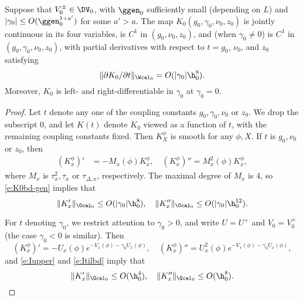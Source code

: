 \begin{prop}
\label{prop:Ksmooth}
Suppose that $V_0^\pm \in \DV_0$, with $\ggen_0$ sufficiently small
(depending on $L$) and $|\gamma_0| \le O(\ggen_0^{1+a'})$
for some $a' >a$.
The map $K_0(g_0, \gamma_0, \nu_0, z_0)$ is jointly continuous
in its four variables, is
$C^1$ in $(g_0, \nu_0, z_0)$,
and (when $\gamma_0 \ne 0$) is $C^1$ in $(g_0, \gamma_0, \nu_0, z_0)$,
with partial derivatives with respect to $t = g_0$, $\nu_0$, and $z_0$ satisfying
\begin{equation}
\label{e:ddpK}
\|\partial K_0 / \partial t\|_{\Wcal_0} = O(|\gamma_0| \h_0^8).
\end{equation}
Moreover, $K_0$
is left- and right-differentiable in $\gamma_0$ at $\gamma_0 = 0$.
\end{prop}

\begin{proof}
Let $t$ denote any one of the coupling constants $g_0, \gamma_0, \nu_0$ or $z_0$.
We drop the subscript $0$, and let $K(t)$ denote $K_0$ viewed as a function of $t$,
with the remaining coupling constants fixed. Then $K^\phi_X$ is smooth for any $\phi, X$.
If $t$ is $g_0, \nu_0$ or $z_0$, then
\begin{align}
(K^\phi_x)'  &= -M_x(\phi) K^\phi_x, \quad
(K^\phi_x)'' = M_x^2(\phi) K^\phi_x,
\end{align}
where $M_x$ is $\tau_x^2, \tau_x$ or $\tau_{\Delta,x}$, respectively.
The maximal degree of $M_x$ is $4$, so
\eqref{e:K0bd-gen} implies that
\begin{equation}
\label{e:Kprime-bd1}
\|K'_x\|_{\Gcal_0} \le O(|\gamma_0| \h_0^{8}),
  \quad
\|K''_x\|_{\Gcal_0} \le O(|\gamma_0| \h_0^{12}).
\end{equation}

For $t$ denoting $\gamma_0$,
we restrict attention to $\gamma_0 > 0$, and write $U = U^+$
and $V_0 = V^+_0$ (the case $\gamma_0 < 0$ is similar). Then
\begin{equation}
\label{e:dKdgamma0}
(K^\phi_x)'  = -U_x(\phi) e^{-V_x(\phi) - \gamma_0 U_x(\phi)}, \quad
(K^\phi_x)'' = U_x^2(\phi) e^{-V_x(\phi) - \gamma_0 U_x(\phi)},
\end{equation}
and \eqref{e:Iupper} and \eqref{e:Itilbd} imply that
\begin{equation}
\label{e:Kprime-bd2}
\|K'_x\|_{\Gcal_0} \le O(\h_0^4),
  \quad
\|K''_x\|_{\Gcal_0} \le O(\h_0^8).
\end{equation}


\end{proof}
